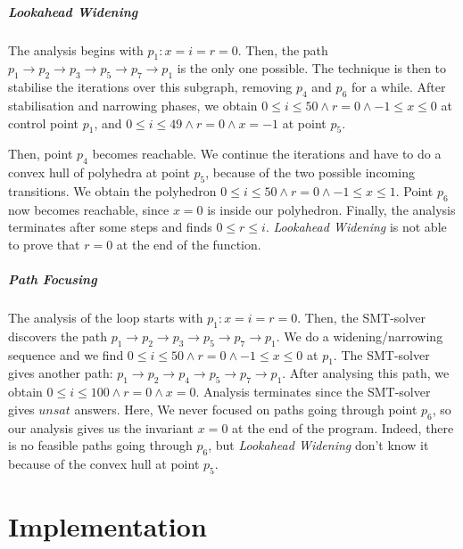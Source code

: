 \documentclass[a4paper,english,titlepage,11pt]{report}
\begin{document}
\paragraph{Lookahead Widening} 
The analysis begins with $p_1: x=i=r=0$. Then, the path $p_1 \rightarrow p_2
\rightarrow p_3 \rightarrow p_5 \rightarrow p_7 \rightarrow p_1$ is the only one
possible. The technique is then to stabilise the iterations over this subgraph,
removing $p_4$ and $p_6$ for a while. After stabilisation and narrowing phases,
we obtain $ 0 \leq i \leq 50 \wedge r=0 \wedge -1 \leq x \leq 0$ at
control point $p_1$, and 
$ 0 \leq i \leq 49 \wedge r=0 \wedge x=-1$ at point $p_5$.

Then, point $p_4$ becomes reachable. We continue the iterations and have to do
a convex hull of polyhedra at point $p_5$, because of the two possible incoming
transitions.
We obtain the polyhedron
$ 0 \leq i \leq 50 \wedge r=0 \wedge -1 \leq x \leq 1$.
Point $p_6$ now becomes reachable, since $x=0$ is inside our polyhedron.
Finally, the analysis terminates after some steps and finds $0 \leq r \leq i$.
\emph{Lookahead Widening} is not able to prove that $r = 0$ at the end of the
function.

\paragraph{Path Focusing} 
The analysis of the loop starts with 
$p_1: x=i=r=0$. Then, the SMT-solver discovers the path $p_1 \rightarrow p_2
\rightarrow p_3 \rightarrow p_5 \rightarrow p_7 \rightarrow p_1$. We do a
widening/narrowing sequence and we find 
$ 0 \leq i \leq 50 \wedge r=0 \wedge -1 \leq x \leq 0$ at $p_1$. The SMT-solver
gives another path: 
$p_1 \rightarrow p_2
\rightarrow p_4 \rightarrow p_5 \rightarrow p_7 \rightarrow p_1$. After
analysing this path, we obtain 
$ 0 \leq i \leq 100 \wedge r=0 \wedge x=0$. Analysis terminates since the
SMT-solver gives $unsat$ answers. Here, We never focused on paths going through
point $p_6$, so our analysis gives us the invariant $x=0$ at the end of the
program. Indeed, there is no feasible paths going through $p_6$, but
\emph{Lookahead Widening} don't know it because of the convex hull at point
$p_5$.





\FloatBarrier
\chapter{Implementation}\label{implementationpart}
\end{document}
